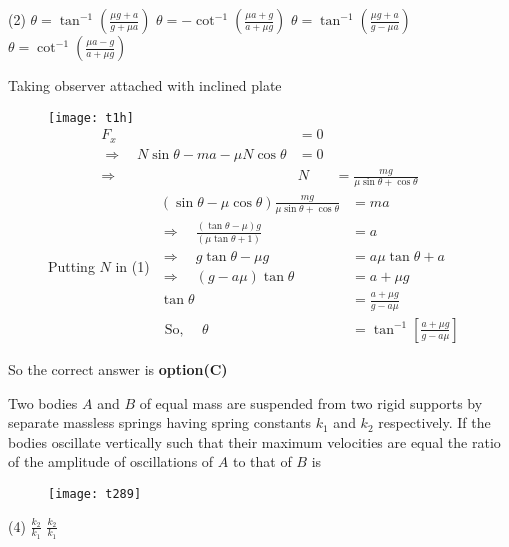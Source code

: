 \begin{questions}
\begin{tasks}(2)
	\task[\textbf{A.}]   $\theta=\tan ^{-1}\left(\frac{\mu g+a}{g+\mu a}\right)$
	\task[\textbf{B.}] $\theta=-\cot ^{-1}\left(\frac{\mu a+g}{a+\mu g}\right)$
	\task[\textbf{C.}] $\theta=\tan ^{-1}\left(\frac{\mu g+a}{g-\mu a}\right)$
	\task[\textbf{D.}] $\theta=\cot ^{-1}\left(\frac{\mu a-g}{a+\mu g}\right)$
\end{tasks}
\begin{answer}Taking observer attached with inclined plate
	\begin{figure}[H]
		\centering
		\texttt{[image: t1h]}
		$$
		\begin{aligned}
		F_{x} &=0 \\
		\Rightarrow \quad N \sin \theta-m a-\mu N \cos \theta &=0 \\
		\Rightarrow \quad & N &=\frac{m g}{\mu \sin \theta+\cos \theta}
		\end{aligned}
		$$
		Putting $N$ in (1)
		$\begin{aligned}(\sin \theta-\mu \cos \theta) \frac{m g}{\mu \sin \theta+\cos \theta} &=m a \\ \Rightarrow \quad \frac{(\tan \theta-\mu) g}{(\mu \tan \theta+1)} &=a \\ \Rightarrow \quad g \tan \theta-\mu g &=a \mu \tan \theta+a \\ \Rightarrow \quad(g-a \mu) \tan \theta &=a+\mu g \\ \tan \theta &=\frac{a+\mu g}{g-a \mu} \\ \text { So, } \quad \theta &=\tan ^{-1}\left[\frac{a+\mu g}{g-a \mu}\right] \end{aligned}$
	\end{figure}
	So the correct answer is \textbf{option(C)}
\end{answer}
\begin{minipage}{\textwidth}
	\question Two bodies $A$ and $B$ of equal mass are suspended from two rigid supports by separate massless springs having spring constants $k_{1}$ and $k_{2}$ respectively. If the bodies oscillate vertically such that their maximum velocities are equal the ratio of the amplitude of oscillations of $A$ to that of $B$ is
\end{minipage}
\begin{figure}[H]
	\centering
	\texttt{[image: t289]}
\end{figure}
\begin{tasks}(4)
	\task[\textbf{A.}] $\frac{k_{2}}{k_{1}}$
	\task[\textbf{B.}] $\frac{k_{2}}{k_{1}}$

\end{tasks}
\end{questions}

